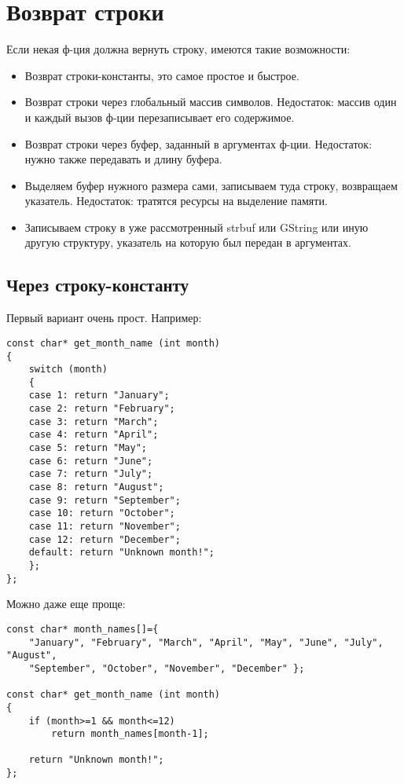 ﻿\section{Возврат строки}

Если некая ф-ция должна вернуть строку, имеются такие возможности:

\begin{itemize}
\item
Возврат строки-константы, это самое простое и быстрое.

\item
Возврат строки через глобальный массив символов. Недостаток: массив один и каждый вызов ф-ции перезаписывает
его содержимое.

\item
Возврат строки через буфер, заданный в аргументах ф-ции. Недостаток: нужно также передавать и длину буфера.

\item
Выделяем буфер нужного размера сами, записываем туда строку, возвращаем указатель. Недостаток: тратятся ресурсы
на выделение памяти.

\item
Записываем строку в уже рассмотренный strbuf или GString или иную другую структуру, указатель на которую был
передан в аргументах.

\end{itemize}

\subsection{Через строку-константу}

Первый вариант очень прост. Например:

\begin{lstlisting}
const char* get_month_name (int month)
{
	switch (month)
	{
	case 1: return "January";
	case 2: return "February";
	case 3: return "March";
	case 4: return "April";
	case 5: return "May";
	case 6: return "June";
	case 7: return "July";
	case 8: return "August";
	case 9: return "September";
	case 10: return "October";
	case 11: return "November";
	case 12: return "December";
	default: return "Unknown month!";
	};
};
\end{lstlisting}

Можно даже еще проще:

\begin{lstlisting}
const char* month_names[]={
	"January", "February", "March", "April", "May", "June", "July", "August",
	"September", "October", "November", "December" };

const char* get_month_name (int month)
{
	if (month>=1 && month<=12)
		return month_names[month-1];

	return "Unknown month!";
};
\end{lstlisting}


